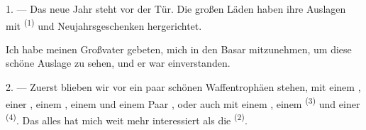 %

\VUsaut{4.0mm}
\VUsaut{2.0mm}
\VUsaut{3.4mm}

1. --- Das neue Jahr steht vor der Tür. Die großen Läden haben ihre Auslagen mit
 \textsuperscript{(1)} und Neujahrsgeschenken hergerichtet.

Ich habe meinen Großvater gebeten, mich in den Basar mitzunehmen, um diese schöne
Auslage zu sehen, und er war einverstanden.

2. --- Zuerst blieben wir vor ein paar schönen Waffentrophäen stehen, mit einem
, einer , einem , einem
 und einem Paar , oder auch mit einem
, einem  \textsuperscript{(3)} und einer
 \textsuperscript{(4)}. Das alles hat mich weit mehr interessiert als
die  \textsuperscript{(2)}.

\VUsaut{3.0mm}
\VUsaut{2.6mm}

